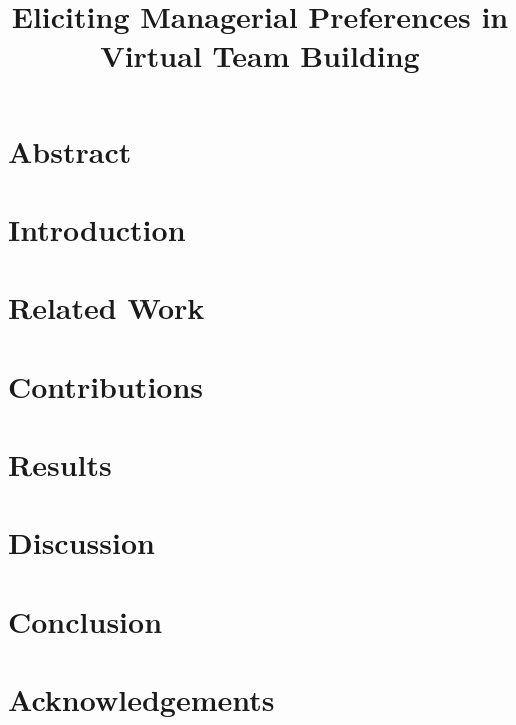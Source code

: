 \documentclass[english,review]{elsarticle}
\author{}
\title{Eliciting Managerial Preferences in Virtual Team Building}
\date{}
\begin{document}
\maketitle

\section{Abstract}
%

\section{Introduction}
\label{sec:introduction}


\section{Related Work}
\label{sec:related}


\section{Contributions}
\label{sec:methodology}


\section{Results}
\label{sec:results}


\section{Discussion}
\label{sec:discussion}




\section{Conclusion}
\label{sec:conclusion}
%
\printbibliography
\section{Acknowledgements}
%
\end{document}
